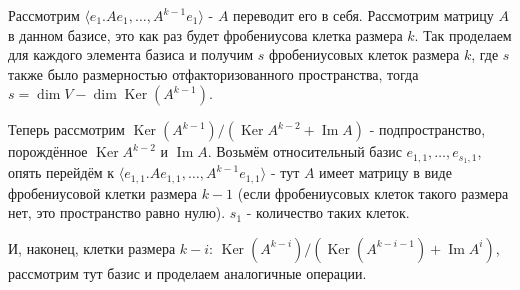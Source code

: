 \documentclass[a4paper,100pt]{article}
\theoremstyle{indented}
\theoremstyle{definition}
\theoremstyle{remark}
\DeclareMathOperator{\Ker}{Ker}
\DeclareMathOperator{\Imf}{Im}
\begin{document}
Рассмотрим $\langle e_1. Ae_1, \ldots, A^{k-1}e_1\rangle$ - $A$ переводит его в себя. Рассмотрим матрицу $A$ в данном базисе, это как раз будет фробениусова клетка размера $k$. Так проделаем для каждого элемента базиса и получим $s$ фробениусовых клеток размера $k$, где $s$ также было размерностью отфакторизованного пространства, тогда $s=\dim V-\dim \Ker (A^{k-1})$. \ 

Теперь рассмотрим $\Ker(A^{k-1})/(\Ker A^{k-2}+\Imf A)$ -  подпространство, порождённое $\Ker A^{k-2}$ и $\Imf A$. Возьмём относительный базис $e_{1, 1}, \ldots, e_{s_1, 1}$, опять перейдём к $\langle e_{1, 1}. Ae_{1, 1}, \ldots, A^{k-1}e_{1, 1}\rangle$ - тут $A$ имеет матрицу в виде фробениусовой клетки размера $k-1$ (если фробениусовых клеток такого размера нет, это пространство равно нулю). $s_1$ - количество таких клеток. \ 

И, наконец, клетки размера $k-i$: $\Ker(A^{k-i})/(\Ker(A^{k-i-1})+\Imf A^i)$, рассмотрим тут базис и проделаем аналогичные операции.
\end{document}
